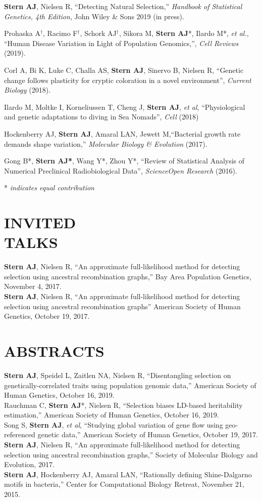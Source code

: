 \documentclass[margin, 10pt]{res} %
\begin{document}
\begin{resume}
{\bf Stern AJ}, Nielsen R, ``Detecting Natural Selection,'' {\it Handbook of Statistical Genetics, 4th Edition},  John Wiley \& Sons 2019 (in press).

Prohaska A$^\dag$, Racimo F$^\dag$, Schork AJ$^\dag$, Sikora M, {\bf Stern AJ}*, Ilardo M*, {\it et al.}, ``Human Disease Variation in Light of Population Genomics,'',  {\it Cell Reviews} (2019).

Corl A, Bi K, Luke C, Challa AS, {\bf Stern AJ}, Sinervo B, Nielsen R, ``Genetic change follows plasticity for cryptic coloration in a novel environment'', {\it Current Biology} (2018).

Ilardo M, Moltke I, Korneliussen T, Cheng J, {\bf Stern AJ}, {\it et al}, ``Physiological and genetic adaptations to diving in Sea Nomads'', {\it Cell} (2018)

Hockenberry AJ, {\bf Stern AJ}, Amaral LAN, Jewett M,``Bacterial growth rate demands shape variation,'' {\it Molecular Biology \& Evolution} (2017).

Gong B*, {\bf Stern AJ*}, Wang Y*, Zhou Y*, ``Review of Statistical Analysis of Numerical Preclinical Radiobiological Data'', {\it ScienceOpen Research} (2016). 


* {\it indicates equal contribution}


\section{INVITED\\TALKS}
{\bf Stern AJ}, Nielsen R, ``An approximate full-likelihood method for detecting selection using ancestral recombination graphs,'' Bay Area Population Genetics, November 4, 2017.\\
{\bf Stern AJ}, Nielsen R, ``An approximate full-likelihood method for detecting selection using ancestral recombination graphs'' American Society of Human Genetics, October 19, 2017.

\section{ABSTRACTS}
{\bf Stern AJ}, Speidel L, Zaitlen NA, Nielsen R, ``Disentangling selection on genetically-correlated traits using population genomic data,'' American Society of Human Genetics, October 16, 2019.\\
Rauchman C, {\bf Stern AJ}*, Nielsen R, ``Selection biases LD-based heritability estimation,'' American Society of Human Genetics, October 16, 2019.\\
Song S, {\bf Stern AJ}, {\it et al}, ``Studying global variation of gene flow using geo-referenced genetic data,'' American Society of Human Genetics, October 19, 2017.\\
{\bf Stern AJ}, Nielsen R, ``An approximate full-likelihood method for detecting selection using ancestral recombination graphs,'' Society of Molecular Biology and Evolution, 2017.\\
{\bf Stern AJ}, Hockenberry AJ,  Amaral LAN, “Rationally defining Shine-Dalgarno motifs in bacteria,” Center for Computational Biology Retreat, November 21, 2015.


\end{resume}
\end{document}
